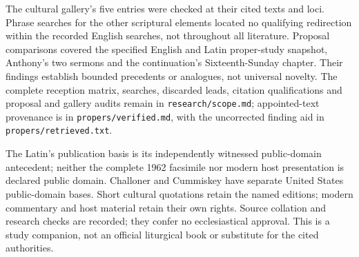 The cultural gallery's five entries were checked at their cited texts and loci. Phrase searches for the other scriptural elements located no qualifying redirection within the recorded English searches, not throughout all literature. Proposal comparisons covered the specified English and Latin proper-study snapshot, Anthony's two sermons and the continuation's Sixteenth-Sunday chapter. Their findings establish bounded precedents or analogues, not universal novelty. The complete reception matrix, searches, discarded leads, citation qualifications and proposal and gallery audits remain in \texttt{research/scope.md}; appointed-text provenance is in \texttt{propers/verified.md}, with the uncorrected finding aid in \texttt{propers/retrieved.txt}.

The Latin's publication basis is its independently witnessed public-domain antecedent; neither the complete 1962 facsimile nor modern host presentation is declared public domain. Challoner and Cummiskey have separate United States public-domain bases. Short cultural quotations retain the named editions; modern commentary and host material retain their own rights. Source collation and research checks are recorded; they confer no ecclesiastical approval. This is a study companion, not an official liturgical book or substitute for the cited authorities.
